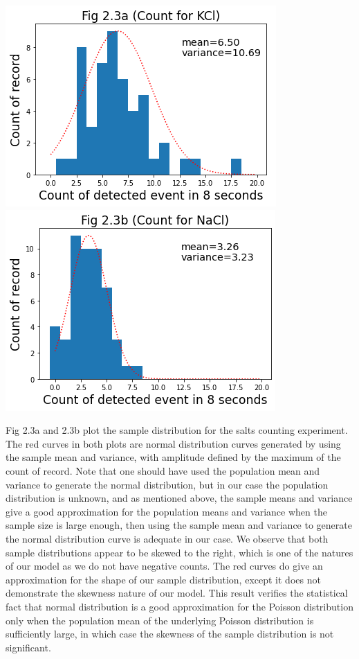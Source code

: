 \documentclass[11pt]{book}
\theoremstyle{break}
\theoremstyle{break}
\begin{document}
\hfill\break
\begin{center}
\includegraphics[scale=0.5]{Fig2.3a.png}\qquad
\includegraphics[scale=0.5]{Fig2.3b.png}
\end{center}

Fig 2.3a and 2.3b plot the sample distribution for the salts counting experiment. The red curves in both plots are normal distribution curves generated by using the sample mean and variance, with amplitude defined by the maximum of the count of record. Note that one should have used the population mean and variance to generate the normal distribution, but in our case the population distribution is unknown, and as mentioned above, the sample means and variance give a good approximation for the population means and variance when the sample size is large enough, then using the sample mean and variance to generate the normal distribution curve is adequate in our case. We observe that both sample distributions appear to be skewed to the right, which is one of the natures of our model as we do not have negative counts. The red curves do give an approximation for the shape of our sample distribution, except it does not demonstrate the skewness nature of our model. This result verifies the statistical fact that normal distribution is a good approximation for the Poisson distribution only when the population mean of the underlying Poisson distribution is sufficiently large, in which case the skewness of the sample distribution is not significant.\\
\end{document}
